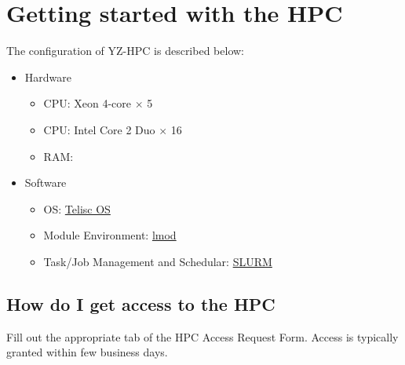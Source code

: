 \documentclass[11pt]{article}
\numberwithin{figure}{section}
\newcommand\CC{\Lang{\mbox{C++}}\xspace}
\newcommand\Lang[1]{\textsc{#1}}
\begin{document}
\maketitle


\section{Getting started with the HPC}

The configuration of YZ-HPC is described below:

\begin{itemize}
    \item Hardware
        \begin{itemize}
            \item CPU: Xeon 4-core $\times$ 5
            \item CPU: Intel Core 2 Duo $\times$ 16
            \item RAM: 
        \end{itemize}
    \item Software
        \begin{itemize}
            \item OS: \href{https://www.teliscos.org}{Telisc OS}
            \item Module Environment: \href{https://lmod.readthedocs.io/en/latest/} {lmod}
            \item Task/Job Management and Schedular: \href{https://slurm.schedmd.com} {SLURM}
        \end{itemize}
\end{itemize}

\subsection{How do I get access to the HPC}
Fill out the appropriate tab of the HPC Access Request Form. Access is
typically granted within few business days.
\end{document}
